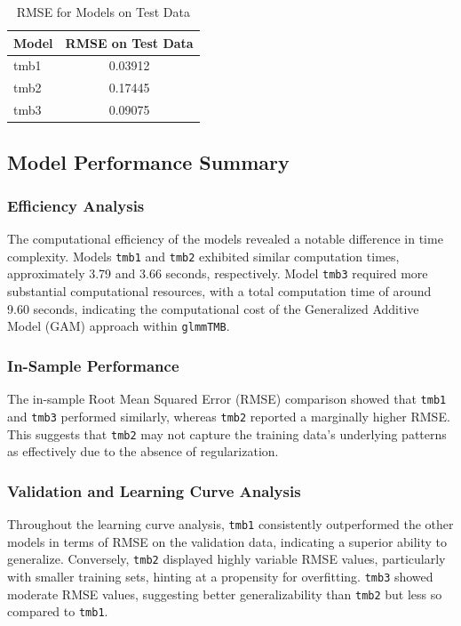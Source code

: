 \documentclass[12pt, twoside,hidelinks]{article}
\theoremstyle{definition}
\numberwithin{equation}{section}
\begin{document}
\begin{table}[h]
\centering
\begin{tabular}{|l|c|}
\hline
Model & RMSE on Test Data \\
\hline
tmb1 & 0.03912 \\
tmb2 & 0.17445 \\
tmb3 & 0.09075 \\
\hline
\end{tabular}
\caption{RMSE for Models on Test Data}
\end{table}


\subsection{Model Performance Summary}

\subsubsection*{Efficiency Analysis}
The computational efficiency of the models revealed a notable difference in time complexity. Models \texttt{tmb1} and \texttt{tmb2} exhibited similar computation times, approximately 3.79 and 3.66 seconds, respectively. Model \texttt{tmb3} required more substantial computational resources, with a total computation time of around 9.60 seconds, indicating the computational cost of the Generalized Additive Model (GAM) approach within \texttt{glmmTMB}.

\subsubsection*{In-Sample Performance}
The in-sample Root Mean Squared Error (RMSE) comparison showed that \texttt{tmb1} and \texttt{tmb3} performed similarly, whereas \texttt{tmb2} reported a marginally higher RMSE. This suggests that \texttt{tmb2} may not capture the training data's underlying patterns as effectively due to the absence of regularization.

\subsubsection*{Validation and Learning Curve Analysis}
Throughout the learning curve analysis, \texttt{tmb1} consistently outperformed the other models in terms of RMSE on the validation data, indicating a superior ability to generalize. Conversely, \texttt{tmb2} displayed highly variable RMSE values, particularly with smaller training sets, hinting at a propensity for overfitting. \texttt{tmb3} showed moderate RMSE values, suggesting better generalizability than \texttt{tmb2} but less so compared to \texttt{tmb1}.
\end{document}
